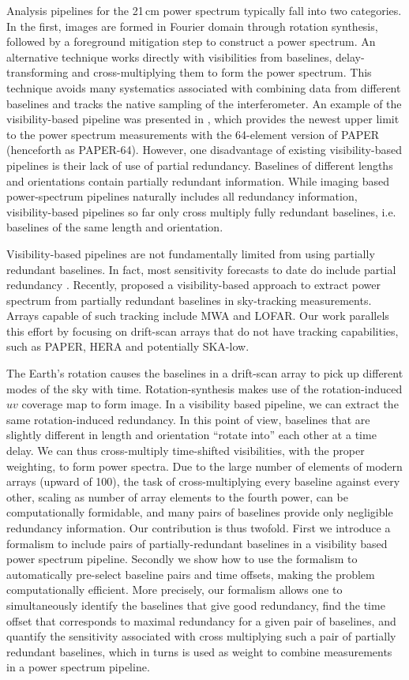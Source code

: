 \documentclass[twocolumn,apj,numberedappendix]{emulateapj}
\renewcommand\[{\begin{equation}}
\renewcommand\]{\end{equation}}
\begin{document}
Analysis pipelines for the 21\,cm power spectrum typically fall into two categories. In the first, images are formed in Fourier domain through rotation synthesis, followed by a foreground mitigation step to construct a power spectrum. An alternative technique works directly with visibilities from baselines, delay-transforming and cross-multiplying them to form the power spectrum. This technique avoids many systematics associated with combining data from different baselines and tracks the native sampling of the interferometer. An example of the visibility-based pipeline was presented in \cite{Ali2015}, which provides the newest upper limit to the power spectrum
measurements with the 64-element version of PAPER (henceforth as PAPER-64). However, one disadvantage of existing visibility-based pipelines is their lack of use of partial redundancy. Baselines of different lengths and orientations contain partially redundant information. While imaging based power-spectrum pipelines naturally includes all redundancy information, visibility-based pipelines so far only cross multiply fully redundant baselines, i.e. baselines of the same length and orientation.

Visibility-based pipelines are not fundamentally limited from using partially redundant baselines. In fact, most sensitivity forecasts to date do include partial redundancy \citep{Pobersens, HERA, JoshAntPos}. Recently, \cite{wterm} proposed a visibility-based approach to extract power spectrum from partially redundant baselines in sky-tracking measurements. Arrays capable of such tracking include MWA and LOFAR. Our work parallels this effort by focusing on drift-scan arrays that do not have tracking capabilities, such as PAPER, HERA and potentially SKA-low.

The Earth's rotation causes the baselines in a drift-scan array to pick up different modes of the sky with time. Rotation-synthesis makes use of the rotation-induced $uv$ coverage map to form image. In a visibility based pipeline, we can extract the same rotation-induced redundancy. In this point of view, baselines that are slightly different in length and orientation
``rotate into'' each other at a time delay. We can thus cross-multiply time-shifted visibilities, with the proper weighting, to form power spectra.  Due to the large number of elements of modern arrays (upward of 100), the task of cross-multiplying every baseline against every other, scaling as number of array elements to the fourth power, can be computationally formidable, and many pairs of baselines provide only negligible redundancy information. Our contribution is thus twofold. First we introduce a formalism to include pairs of partially-redundant baselines in a visibility based power spectrum pipeline. Secondly we show how to use the formalism to automatically pre-select baseline pairs and time offsets, making the problem computationally efficient. More precisely, our formalism allows one to simultaneously identify the baselines that give good
redundancy, find the time offset that corresponds to maximal redundancy for a given pair of baselines, and quantify the sensitivity associated with cross multiplying
such a pair of partially redundant baselines, which in turns is used as weight to combine measurements in a power spectrum pipeline. 
\end{document}
